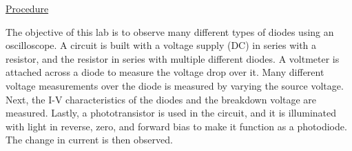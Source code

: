 \underline{Procedure}

The objective of this lab is to observe many different types of diodes using an oscilloscope. A circuit is built with a voltage supply (DC) in series with a resistor, and the resistor in series with multiple different diodes. A voltmeter is attached across a diode to measure the voltage drop over it. Many different voltage measurements over the diode is measured by varying the source voltage. Next, the I-V characteristics of the diodes and the breakdown voltage are measured. Lastly, a phototransistor is used in the circuit, and it is illuminated with light in reverse, zero, and forward bias to make it function as a photodiode. The change in current is then observed. \\

